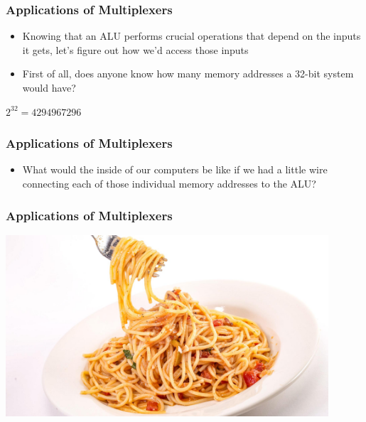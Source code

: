 \documentclass{beamer}
\begin{document}
             \begin{frame}
             
             	\frametitle{Applications of Multiplexers}
             	\begin{itemize}
             		\item Knowing that an ALU performs crucial operations that depend on the inputs it gets, let's figure out how we'd access those inputs
             		\item First of all, does anyone know how many memory addresses a 32-bit system would have? \newline
             		
             	\end{itemize}
             	
             	\centering
             	
             	\begin{Huge}
             		\texttt{$2^{32} = 4294967296$}
             	\end{Huge}
             	
             \end{frame}
             
             
             \begin{frame}
             
             	\frametitle{Applications of Multiplexers}
             	
             	\begin{itemize}
             		\item What would the inside of our computers be like if we had a little wire connecting each of those individual memory addresses to the ALU?
             	\end{itemize}
    
             	
             \end{frame}
             
             \begin{frame}
             	\frametitle{Applications of Multiplexers}
             	\centering
             	\includegraphics[width=0.9\textwidth]{spaghetti}
             \end{frame}
             
\end{document}
